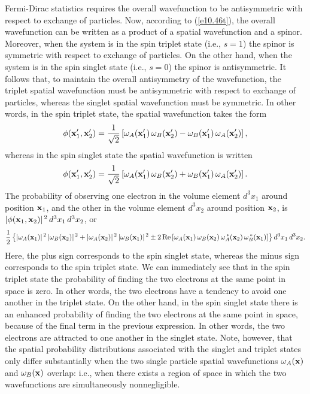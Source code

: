 Fermi-Dirac statistics requires the overall wavefunction to be antisymmetric with respect to exchange of particles. Now, according to (\ref{e10.46t}), 
the overall wavefunction can be written as a product of a spatial wavefunction and a spinor. Moreover, when the system is in the spin triplet
state (i.e., $s=1$) the spinor is symmetric with respect to exchange of particles. On the other hand, when the system is in the spin singlet
state (i.e., $s=0$) the spinor is antisymmetric. It follows that, to maintain the overall antisymmetry
of the wavefunction, the triplet spatial wavefunction must be antisymmetric with respect to exchange of particles, whereas the singlet
spatial wavefunction must be symmetric. In other words, in the spin triplet state, the spatial wavefunction takes the form
\begin{equation}
\phi({\bf x}_1',{\bf x}_2') = \frac{1}{\sqrt{2}}\left[\omega_A({\bf x}_1')\,\omega_B({\bf x}_2')-\omega_B({\bf x}_1')\,\omega_A({\bf x}_2')\right],
\end{equation}
whereas in the spin singlet state the spatial wavefunction is written
\begin{equation}
\phi({\bf x}_1',{\bf x}_2') = \frac{1}{\sqrt{2}}\left[\omega_A({\bf x}_1')\,\omega_B({\bf x}_2')+\omega_B({\bf x}_1')\,\omega_A({\bf x}_2')\right].
\end{equation}
The probability of observing one electron in the volume element $d^3 x_1$ around position ${\bf x}_1$, and the
other in the volume element $d^3x_2$ around position ${\bf x}_2$, is $|\phi({\bf x}_1,{\bf x}_2)|^{\,2}\,d^3x_1\,d^3x_2$,  or
\begin{equation}
\frac{1}{2}\left\{|\omega_A({\bf x}_1)|^{\,2}\,|\omega_B({\bf x}_2)|^{\,2}+|\omega_A({\bf x}_2)|^{\,2}\,|\omega_B({\bf x}_1)|^{\,2}
\pm 2\,{\rm Re}\left[\omega_A({\bf x}_1)\,\omega_B({\bf x}_2)\,\omega_A^{\,\ast}({\bf x}_2)\,\omega_B^{\,\ast}({\bf x}_1)\right]\right\}d^3 x_1\,d^3x_2.
\end{equation}
Here, the plus sign corresponds to the spin singlet state, whereas the minus sign corresponds to the spin triplet state. We can immediately see that in the
spin triplet state the probability of finding the two electrons at the same point in space is zero. In other words, the two electrons have
a tendency to avoid one another in the triplet state. On the other hand, in the spin singlet state there is an enhanced probability of finding the
two electrons at the same point in space, because of the final term in the previous expression. In other words, the two electrons are attracted to
one another in the singlet state. 
Note, however, that the spatial probability distributions
associated with the singlet and triplet states only differ substantially when the two single particle spatial wavefunctions $\omega_A({\bf x})$ and $\omega_B({\bf x})$
overlap: i.e., when there exists a region of space in which the two wavefunctions are simultaneously nonnegligible. 

